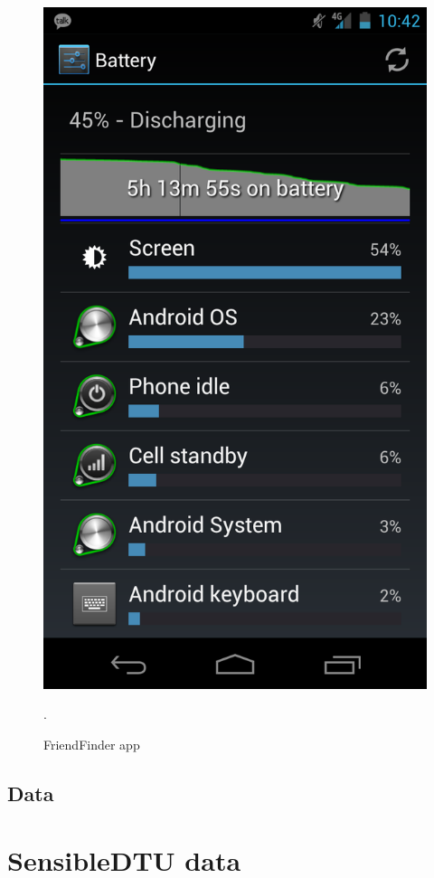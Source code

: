 \begin{figure}[h]
	\begin{center}
		\includegraphics[scale=0.2]{figures/galaxy-nexus-battery.png}
	\end{center}
	
	\caption{FriendFinder app}.
	\label{pic:clientserver}

\end{figure} 

\subsection{Data}


\section{SensibleDTU data} 	